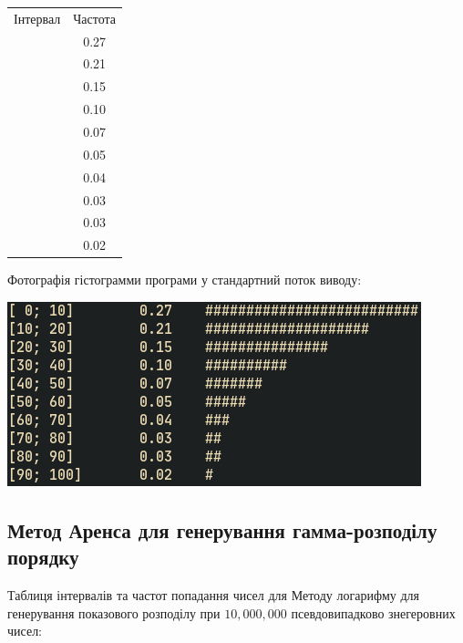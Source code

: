 \documentclass[a4paper,12pt]{report}
\begin{document}
\begin{table}[ht]
\centering %
\begin{tabular}{c c} %
  Інтервал & Частота \\\relax
[ 0; 10] & 0.27 \\\relax
[10; 20] & 0.21 \\\relax
[20; 30] & 0.15 \\\relax
[30; 40] & 0.10 \\\relax
[40; 50] & 0.07 \\\relax
[50; 60] & 0.05 \\\relax
[60; 70] & 0.04 \\\relax
[70; 80] & 0.03 \\\relax
[80; 90] & 0.03 \\\relax
[90; 100] & 0.02
\end{tabular}
\end{table}
Фотографія гістограмми програми у стандартний поток виводу:
\begin{center}\includegraphics[scale=0.5]{log}\end{center}


\subsection{Метод Аренса для генерування гамма-розподілу порядку}
Таблиця інтервалів та частот попадання чисел для Методу логарифму для генерування показового розподілу при $10,000,000$ псевдовипадково знегеровних чисел:
\end{document}
